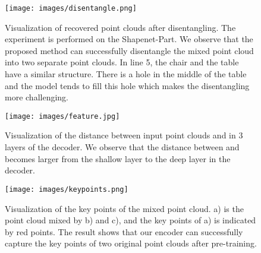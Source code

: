 \documentclass[journal]{IEEEtran}
\begin{document}
\begin{figure}[t]
\begin{center}
\texttt{[image: images/disentangle.png]}
\end{center}
\vspace{-.15in}
   \caption{Visualization of recovered point clouds after disentangling. The experiment is performed on the Shapenet-Part. 
We observe that the proposed method can successfully disentangle the mixed point cloud into two separate point clouds. In line 5, the chair and the table have a similar structure. There is a hole in the middle of the table and the model tends to fill this hole which makes the disentangling more challenging.}
\label{fig:disentangle}
\end{figure}







\begin{figure}[t]
\begin{center}
\texttt{[image: images/feature.jpg]}
\end{center}
\vspace{-.15in}
   \caption{Visualization of the distance between input point clouds  and  in 3 layers of the decoder. We observe that the distance between  and  becomes larger from the shallow layer to the deep layer in the decoder.}
\label{fig:feature}
\end{figure}




\begin{figure}[t]
\begin{center}
\texttt{[image: images/keypoints.png]}
\end{center}
\vspace{-.15in}
   \caption{Visualization of the key points of the mixed point cloud. a) is the point cloud mixed by b) and c), and the key points of a) is indicated by red points. The result shows that our encoder can successfully capture the key points of two original point clouds after pre-training.} \label{fig:keypoints}
\end{figure}
\end{document}
